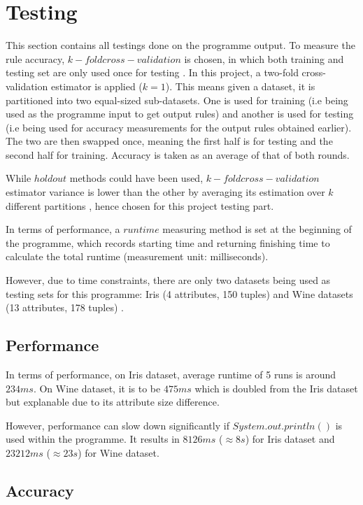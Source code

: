 \chapter{Testing}

This section contains all testings done on the programme output. To measure the rule accuracy, $k-fold cross-validation$ is chosen, in which both training and testing set are only used once for testing \cite{Kohavi95astudy}. In this project, a two-fold cross-validation estimator is applied ($k=1$). This means given a dataset, it is partitioned into two equal-sized sub-datasets. One is used for training (i.e being used as the programme input to get output rules) and another is used for testing (i.e being used for accuracy measurements for the output rules obtained earlier). The two are then swapped once, meaning the first half is for testing and the second half for training. Accuracy is taken as an average of that of both rounds.

While $holdout$ methods could have been used, $k-fold cross-validation$ estimator variance is lower than the other by averaging its estimation over $k$ different partitions \cite{Kohavi95astudy}, hence chosen for this project testing part.

In terms of performance, a $runtime$ measuring method is set at the beginning of the programme, which records starting time and returning finishing time to calculate the total runtime (measurement unit: milliseconds).

However, due to time constraints, there are only two datasets being used as testing sets for this programme: Iris (4 attributes, 150 tuples) and Wine datasets (13 attributes, 178 tuples) \cite{ucirepo}.


\section{Performance}

In terms of performance, on Iris dataset, average runtime of 5 runs is around $234ms$. On Wine dataset, it is to be $475ms$ which is doubled from the Iris dataset but explanable due to its attribute size difference.

However, performance can slow down significantly if $System.out.println()$ is used within the programme. It results in $8126ms$ ($\approx 8s$) for Iris dataset and $23212ms$ ($\approx 23s$) for Wine dataset.  

\section{Accuracy}

